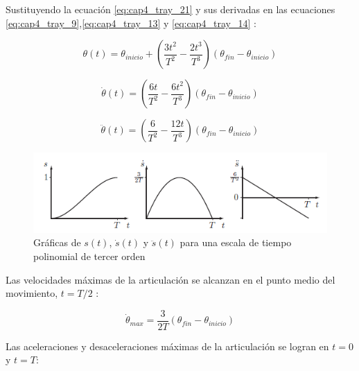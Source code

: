             Sustituyendo la ecuación \ref{eq:cap4_tray_21} y sus derivadas en las ecuaciones \ref{eq:cap4_tray_9},\ref{eq:cap4_tray_13} y  \ref{eq:cap4_tray_14} :
            
            \begin{equation}
                \theta(t)= \theta_{inicio} + \left(  \frac{3t^{2}}{T^2}-\frac{2t^{3}}{T^3} \right) (\theta_{fin}-\theta_{inicio})            
                \label{eq:cap4_tray_22}
             \end{equation}   
             
            \begin{equation}
                  \dot{\theta}(t)= \left(  \frac{6t}{T^2}-\frac{6t^{2}}{T^3} \right) (\theta_{fin}-\theta_{inicio})
                \label{eq:cap4_tray_23}
             \end{equation} 
             
            \begin{equation}
                \ddot{\theta}(t)= \left(  \frac{6}{T^2}-\frac{12t}{T^3} \right) (\theta_{fin}-\theta_{inicio})
                \label{eq:cap4_tray_24}
             \end{equation} 
             
             \begin{figure}[htb]
                \centering
                \includegraphics[width=0.8\linewidth]{Main/Chapter4/Images4/cap4_tray_8.png}
                \caption{Gráficas de $s(t)$, $\dot{s}(t)$ y $\ddot{s}(t)$ para una escala de tiempo polinomial de tercer orden \cite{moder_robot} }
                \label{f:Cap4_tray_8}
            \end{figure}  
             
             
        Las velocidades máximas de la articulación se alcanzan en el punto medio del movimiento, $t = T/2$ : 
        
            \begin{equation}
                  {\dot{\theta}}_{max}= \frac{3}{2T} (\theta_{fin}-\theta_{inicio})
                \label{eq:cap4_tray_25}
             \end{equation} 

        Las aceleraciones y desaceleraciones máximas de la articulación se logran en $t = 0$ y $t = T$:
        
